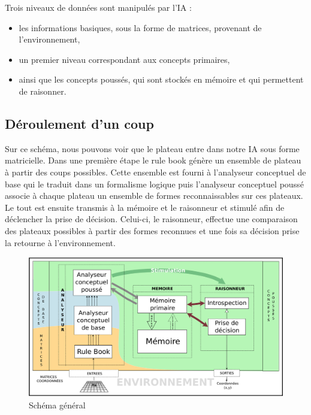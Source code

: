 Trois niveaux de données sont manipulés par l'IA :
\begin{itemize}
\item les informations basiques, sous la forme de matrices, provenant de l'environnement,
\item un premier niveau correspondant aux concepts primaires,
\item ainsi que les concepts poussés, qui sont stockés en mémoire et qui permettent de raisonner.
\end{itemize}

\subsection{Déroulement d'un coup}

Sur ce schéma, nous pouvons voir que le plateau entre dans notre IA sous forme matricielle. Dans une première étape le \og rule book \fg{} génère un ensemble de plateau à partir des coups possibles. Cette ensemble est fourni à l'analyseur conceptuel de base qui le traduit dans un formalisme logique puis l'analyseur conceptuel poussé associe à chaque plateau un ensemble de formes reconnaissables sur ces plateaux. Le tout est ensuite transmis à la mémoire et le raisonneur et stimulé afin de déclencher la prise de décision. Celui-ci, le raisonneur, effectue une comparaison des plateaux possibles à partir des formes reconnues et une fois sa décision prise la retourne à l'environnement.

\begin{figure}[H] 
\includegraphics[width=\textwidth]{files/simplified_general_diagram} 
\caption{Schéma général} 
\label{schema_general}
\end{figure}
